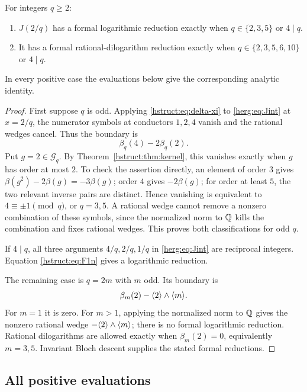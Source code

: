 \begin{theorem}\label{hstruct:thm:J-class}
For integers $q\ge2$:
\begin{enumerate}
\item $J(2/q)$ has a formal logarithmic reduction exactly when
      $q\in\{2,3,5\}$ or $4\mid q$.
\item It has a formal rational-dilogarithm reduction exactly when
      $q\in\{2,3,5,6,10\}$ or $4\mid q$.
\end{enumerate}
In every positive case the evaluations below give the corresponding
analytic identity.
\end{theorem}
\begin{proof}
First suppose $q$ is odd. Applying \eqref{hstruct:eq:delta-xi} to
\eqref{herg:eq:Jint} at $x=2/q$, the numerator symbols at conductors
$1,2,4$ vanish and the rational wedges cancel. Thus the boundary is
\[
 \beta_q(4)-2\beta_q(2).
\]
Put $g=2\in \mathcal{G}_q$. By Theorem~\ref{hstruct:thm:kernel}, this vanishes exactly
when $g$ has order at most $2$. To check the assertion directly, an
element of order $3$ gives $\beta(g^2)-2\beta(g)=-3\beta(g)$; order
$4$ gives $-2\beta(g)$; for order at least $5$, the two relevant
inverse pairs are distinct. Hence vanishing is equivalent to
$4\equiv\pm1\pmod q$, or $q=3,5$. A rational wedge cannot remove a
nonzero combination of these symbols, since the normalized norm to
$\mathbb{Q}$ kills the combination and fixes rational wedges. This proves
both classifications for odd $q$.

If $4\mid q$, all three arguments $4/q,2/q,1/q$ in
\eqref{herg:eq:Jint} are reciprocal integers. Equation \eqref{hstruct:eq:F1n}
gives a logarithmic reduction.

The remaining case is $q=2m$ with $m$ odd. Its boundary is
\begin{equation}\label{hstruct:eq:J-even-boundary}
 \beta_m(2)-\langle 2\rangle\wedge\langle m\rangle.
\end{equation}
For $m=1$ it is zero. For $m>1$, applying the normalized norm to
$\mathbb{Q}$ gives the nonzero rational wedge $-\langle 2\rangle\wedge\langle m\rangle$;
there is no formal logarithmic reduction. Rational dilogarithms are
allowed exactly when $\beta_m(2)=0$, equivalently $m=3,5$.
Invariant Bloch descent supplies the stated formal reductions.
\end{proof}

\subsection{All positive evaluations}

